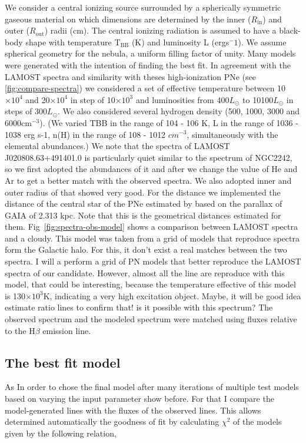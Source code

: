 \documentclass[fleqn,usenatbib]{mnras}
\begin{document}
{We consider a central ionizing source surrounded by a spherically symmetric
gaseous material on which dimensions are determined by the inner ($R_{\mathrm{in}}$) and outer ($R_{\mathrm{out}}$)
radii (cm).  The central ionizing radiation is assumed to have a
black-body shape with temperature T$_{\mathrm{BB}}$ (K) and luminosity L
(ergs$^-1$). We assume spherical geometry for the nebula, a uniform filling factor of unity.
Many models were generated with the intention of finding the best fit.
In agreement with the LAMOST spectra and similarity with theses high-ionization PNe
(see \ref{fig:compare-spectra})
we considered a set of effective temperature between 10$\times10^4$ and 20$\times10^4$
in step of 10$\times10^3$ and luminosities from 400$L_{\odot}$ to 10100$L_{\odot}$ in steps
of 300$L_{\odot}$. We also considered several hydrogen density (500, 1000, 3000 and 6000cm$^{-3}$).
(We varied TBB in the
range of 104 - 106 K, L in the range of 1036 - 1038 erg s-1, n(H)
in the range of 108 - 1012 $cm^{-3}$, simultaneously with the elemental abundances.)
We note that the spectra of LAMOST J020808.63+491401.0 is particularly quiet similar to the
spectrum of NGC2242, so we first adopted the abundances of it and after we change the
value of He and Ar to get a better match with the observed spectra. We also adopted inner
and outer radius
of that showed very good. For the distance we implemented the distance of the central star
of the PNe estimated by \citet{Bailer:2021} based on
the parallax of GAIA of 2.313 kpc. Note that this is the geometrical distances estimated for them. 
Fig~\ref{fig:spectra-obs-model} shows a comparison
between LAMOST spectra and a {\sc cloudy}. This model was taken from a grid of
models that reproduce spectra form the Galactic halo. For this, it don't exist a real matches between the two spectra.
I will a perform a grid of PN models that better reproduce the LAMOST spectra of our candidate.
However, almost all the line are reproduce with this model, that could be interesting, because the
temperature effective of this model is 130$\times10^3$K, indicating a very high excitation object.
Maybe, it will be good idea estimate ratio lines to confirm that! is it possible with this spectrum?
The observed spectrum and the modeled spectrum were
matched using fluxes relative to the H{$\beta$} emission line.

\subsection{The best fit model}
\label{sec:best-fit}
As \citet{Helton:2010, Mondal:2018, Pavana:2019, Mondal:2020, Pandey:2022a, Pandey:2022b} In order to chose the final model
after many iterations of multiple test models based on
varying the input parameter show before. For that
I compare the model-generated lines with the fluxes of the observed lines.
This allows determined automatically the goodness of fit by
calculating $\chi^{2}$
of the models given by the following relation,

}
\end{document}
